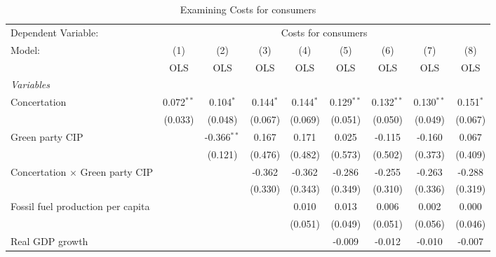 
\begin{table}[htbp]
   \caption{Examining Costs for consumers}
   \centering
   \begin{tabular}{lcccccccc}
      \toprule
      Dependent Variable: & \multicolumn{8}{c}{Costs for consumers}\\
      Model:                                  & (1)          & (2)           & (3)         & (4)         & (5)          & (6)          & (7)          & (8)\\  
                                              &  OLS         & OLS           & OLS         & OLS         & OLS          & OLS          & OLS          & OLS\\  
      \midrule
      \emph{Variables}\\
      Concertation                            & 0.072$^{**}$ & 0.104$^{*}$   & 0.144$^{*}$ & 0.144$^{*}$ & 0.129$^{**}$ & 0.132$^{**}$ & 0.130$^{**}$ & 0.151$^{*}$\\   
                                              & (0.033)      & (0.048)       & (0.067)     & (0.069)     & (0.051)      & (0.050)      & (0.049)      & (0.067)\\   
      Green party CIP                         &              & -0.366$^{**}$ & 0.167       & 0.171       & 0.025        & -0.115       & -0.160       & 0.067\\   
                                              &              & (0.121)       & (0.476)     & (0.482)     & (0.573)      & (0.502)      & (0.373)      & (0.409)\\   
      Concertation $\times$ Green party CIP   &              &               & -0.362      & -0.362      & -0.286       & -0.255       & -0.263       & -0.288\\   
                                              &              &               & (0.330)     & (0.343)     & (0.349)      & (0.310)      & (0.336)      & (0.319)\\   
      Fossil fuel production per capita       &              &               &             & 0.010       & 0.013        & 0.006        & 0.002        & 0.000\\   
                                              &              &               &             & (0.051)     & (0.049)      & (0.051)      & (0.056)      & (0.046)\\   
      Real GDP growth                         &              &               &             &             & -0.009       & -0.012       & -0.010       & -0.007\\   

\end{tabular}
\end{table}
